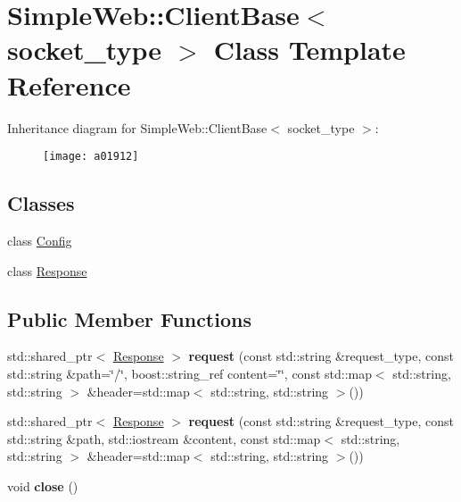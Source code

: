 \hypertarget{a01912}{}\section{Simple\+Web\+:\+:Client\+Base$<$ socket\+\_\+type $>$ Class Template Reference}
\label{a01912}
Inheritance diagram for Simple\+Web\+:\+:Client\+Base$<$ socket\+\_\+type $>$\+:\begin{figure}[H]
\begin{center}
\leavevmode
\texttt{[image: a01912]}
\end{center}
\end{figure}
\subsection*{Classes}
\begin{DoxyCompactItemize}
\item 
class \hyperlink{a01920}{Config}
\item 
class \hyperlink{a01916}{Response}
\end{DoxyCompactItemize}
\subsection*{Public Member Functions}
\begin{DoxyCompactItemize}
\item 
\mbox{\label{a01912_ac8a838ace77f0a1a19b8cb03bdba7e74}} 
std\+::shared\+\_\+ptr$<$ \hyperlink{a01916}{Response} $>$ {\bfseries request} (const std\+::string \&request\+\_\+type, const std\+::string \&path=\char`\"{}/\char`\"{}, boost\+::string\+\_\+ref content=\char`\"{}\char`\"{}, const std\+::map$<$ std\+::string, std\+::string $>$ \&header=std\+::map$<$ std\+::string, std\+::string $>$())
\item 
\mbox{\label{a01912_aca6cb17dbea9adf0cf1daf9d1ea70f76}} 
std\+::shared\+\_\+ptr$<$ \hyperlink{a01916}{Response} $>$ {\bfseries request} (const std\+::string \&request\+\_\+type, const std\+::string \&path, std\+::iostream \&content, const std\+::map$<$ std\+::string, std\+::string $>$ \&header=std\+::map$<$ std\+::string, std\+::string $>$())
\item 
\mbox{\label{a01912_ad21735a9bda2fae6aedd811efae981e1}} 
void {\bfseries close} ()
\end{DoxyCompactItemize}
